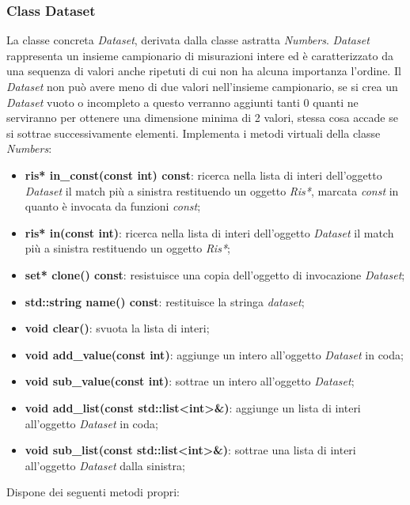 \documentclass[a4paper,10pt]{article}
\begin{document}
    \subsubsection{Class Dataset}
    La classe concreta \textit{Dataset}, derivata dalla classe astratta \textit{Numbers}. \textit{Dataset} rappresenta un insieme campionario di misurazioni intere ed è caratterizzato da una sequenza di valori anche ripetuti di cui non ha alcuna importanza l’ordine. Il \textit{Dataset} non può avere meno di due valori nell’insieme campionario, se si crea un \textit{Dataset} vuoto o incompleto a questo verranno aggiunti tanti 0 quanti ne serviranno per ottenere una dimensione minima di 2 valori, stessa cosa accade se si sottrae successivamente elementi.
    Implementa i metodi virtuali della classe \textit{Numbers}:
	\begin{itemize}
		\item \textbf{ris* in\_const(const int) const}: ricerca nella lista di interi dell'oggetto \textit{Dataset} il match più a sinistra restituendo un oggetto \textit{Ris*}, marcata \textit{const} in quanto è invocata da funzioni \textit{const};
		\item \textbf{ris* in(const int)}: ricerca nella lista di interi dell'oggetto \textit{Dataset} il match più a sinistra restituendo un oggetto \textit{Ris*};
        \item \textbf{set* clone() const}: resistuisce una copia dell'oggetto di invocazione \textit{Dataset};
		\item \textbf{std::string name() const}: restituisce la stringa \textit{dataset};
		\item \textbf{void clear()}: svuota la lista di interi;
        \item \textbf{void add\_value(const int)}: aggiunge un intero all'oggetto \textit{Dataset} in coda;
		\item \textbf{void sub\_value(const int)}: sottrae un intero all'oggetto \textit{Dataset};
		\item \textbf{void add\_list(const std::list<int>\&)}: aggiunge un lista di interi all'oggetto \textit{Dataset} in coda;
        \item \textbf{void sub\_list(const std::list<int>\&)}: sottrae una lista di interi all'oggetto \textit{Dataset} dalla sinistra;
    \end{itemize}
    Dispone dei seguenti metodi propri:
\end{document}
